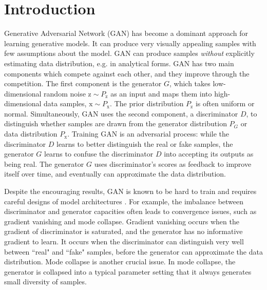 \documentclass[runningheads]{llncs}
\newcommand*{\eg}{e.g. }
\begin{document}
\section{Introduction}
Generative Adversarial Network \cite{goodfellow-nisp-2014} (GAN) has become a dominant approach for learning generative models. It can produce very visually appealing samples with few assumptions about the model. GAN can produce samples \textit{without} explicitly estimating data distribution, \eg in analytical forms. GAN has two main components which compete  against each other, and they improve through the competition. The first component is the generator $G$, which takes low-dimensional random noise $\mathrm{z} \sim P_\mathrm{z}$ as an input and maps them into high-dimensional data samples,  $\mathrm{x} \sim P_\mathrm{x}$. The prior distribution $P_\mathrm{z}$ is often uniform or normal. Simultaneously, GAN uses the second component,  a discriminator $D$, to distinguish whether samples are drawn from the generator distribution $P_G$ or data distribution $P_\mathrm{x}$. Training GAN is an adversarial process: while the discriminator $D$ learns to better distinguish the real or fake samples, the generator $G$ learns to confuse the discriminator $D$ into accepting its outputs as being real. The generator $G$ uses discriminator's scores as feedback to improve itself over time, and eventually can approximate the data distribution.

Despite the encouraging results, GAN is known to be hard to train and requires careful designs of model architectures \cite{goodfellow-nips-2016,radford-arxiv-2015}. For example, the imbalance between discriminator and generator capacities often leads to convergence issues, such as gradient vanishing and mode collapse. Gradient vanishing occurs when the gradient of discriminator is saturated, and the generator has no informative gradient to learn. It occurs when the discriminator can distinguish very well between ``real" and ``fake" samples, before the generator can approximate the data distribution. Mode collapse is another crucial issue. In mode collapse, the generator is collapsed into a typical parameter setting that it always generates small diversity of samples. 
\end{document}
